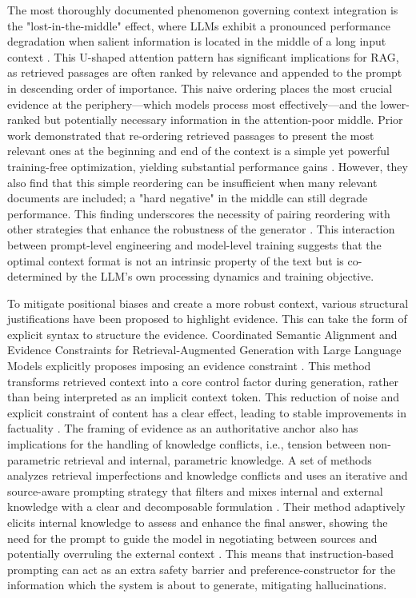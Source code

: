 \documentclass[11pt,a4paper]{article}
\begin{document}
The most thoroughly documented phenomenon governing context integration is the "lost-in-the-middle" effect, where LLMs exhibit a pronounced performance degradation when salient information is located in the middle of a long input context \cite{arxiv:2410.05983v1}. This U-shaped attention pattern has significant implications for RAG, as retrieved passages are often ranked by relevance and appended to the prompt in descending order of importance. This naive ordering places the most crucial evidence at the periphery---which models process most effectively---and the lower-ranked but potentially necessary information in the attention-poor middle. Prior work demonstrated that re-ordering retrieved passages to present the most relevant ones at the beginning and end of the context is a simple yet powerful training-free optimization, yielding substantial performance gains \cite{arxiv:2410.05983v1}. However, they also find that this simple reordering can be insufficient when many relevant documents are included; a "hard negative" in the middle can still degrade performance. This finding underscores the necessity of pairing reordering with other strategies that enhance the robustness of the generator \cite{arxiv:2410.05983v1}. This interaction between prompt-level engineering and model-level training suggests that the optimal context format is not an intrinsic property of the text but is co-determined by the LLM's own processing dynamics and training objective.

To mitigate positional biases and create a more robust context, various structural justifications have been proposed to highlight evidence. This can take the form of explicit syntax to structure the evidence. Coordinated Semantic Alignment and Evidence Constraints for Retrieval-Augmented Generation with Large Language Models explicitly proposes imposing an evidence constraint \cite{arxiv:2603.04647v1}. This method transforms retrieved context into a core control factor during generation, rather than being interpreted as an implicit context token. This reduction of noise and explicit constraint of content has a clear effect, leading to stable improvements in factuality \cite{arxiv:2603.04647v1}. The framing of evidence as an authoritative anchor also has implications for the handling of knowledge conflicts, i.e., tension between non-parametric retrieval and internal, parametric knowledge. A set of methods analyzes retrieval imperfections and knowledge conflicts and uses an iterative and source-aware prompting strategy that filters and mixes internal and external knowledge with a clear and decomposable formulation \cite{arxiv:2410.07176v2}. Their method adaptively elicits internal knowledge to assess and enhance the final answer, showing the need for the prompt to guide the model in negotiating between sources and potentially overruling the external context \cite{arxiv:2410.07176v2}. This means that instruction-based prompting can act as an extra safety barrier and preference-constructor for the information which the system is about to generate, mitigating hallucinations.
\end{document}
